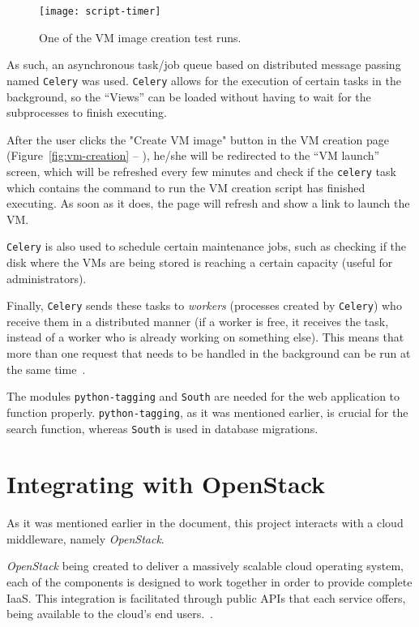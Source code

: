\begin{figure}[h]
  \begin{center}
    \leavevmode
    \texttt{[image: script-timer]}
    \caption{One of the VM image creation test runs.}
    \label{fig:script-timer}
  \end{center}
\end{figure}

As such, an asynchronous task/job queue based on distributed message passing named \texttt{Celery} was used. \texttt{Celery} allows for the execution of certain tasks in the background, so the ``Views'' can be loaded without having to wait for the subprocesses to finish executing.

After the user clicks the "Create VM image" button in the VM creation page (Figure~\ref{fig:vm-creation} -- ), he/she will be redirected to the ``VM launch'' screen, which will be refreshed every few minutes and check if the \texttt{celery} task which contains the command to run the VM creation script has finished executing. As soon as it does, the page will refresh and show a link to launch the VM.

\texttt{Celery} is also used to schedule certain maintenance jobs, such as checking if the disk where the VMs are being stored is reaching a certain capacity (useful for administrators).

Finally, \texttt{Celery} sends these tasks to \textit{workers} (processes created by \texttt{Celery}) who receive them in a distributed manner (if a worker is free, it receives the task, instead of a worker who is already working on something else). This means that more than one request that needs to be handled in the background can be run at the same time~\cite{celery}.

The modules \texttt{python-tagging} and \texttt{South} are needed for the web application to function properly. \texttt{python-tagging}, as it was mentioned earlier, is crucial for the search function, whereas \texttt{South} is used in database migrations.

\section{Integrating with OpenStack}

As it was mentioned earlier in the document, this project interacts with a cloud middleware, namely \textit{OpenStack}.

\textit{OpenStack} being created to deliver a massively scalable cloud operating system, each of the components is designed to work together in order to provide complete IaaS. This integration is facilitated through public APIs that each service offers, being available to the cloud's end users.~\cite{ken-pepple:essex-arch}. 

